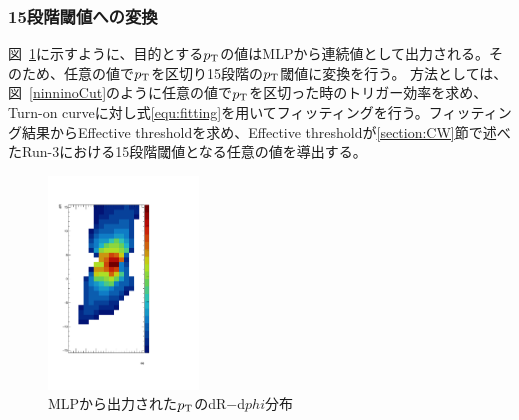 \newpage
\subsubsection{15段階閾値への変換}
図~\ref{fig:all_output}に示すように、目的とする$p_{\rm{T}}$の値はMLPから連続値として出力される。そのため、任意の値で$p_{\rm{T}}$を区切り15段階の$p_{\rm{T}}$閾値に変換を行う。
方法としては、図~\ref{ninninoCut}のように任意の値で$p_{\rm{T}}$を区切った時のトリガー効率を求め、Turn-on curveに対し式\eqref{equ:fitting}を用いてフィッティングを行う。フィッティング結果からEffective thresholdを求め、Effective thresholdが\ref{section:CW}節で述べたRun-3における15段階閾値となる任意の値を導出する。
\begin{figure}[tb]
  \centering
  \includegraphics[clip, width=4cm]{fig/4/all_output_rainbow.pdf}
  \caption{MLPから出力された$p_{\rm{T}}$のdR$-$d$phi$分布}
  \label{fig:all_output}
\end{figure}

